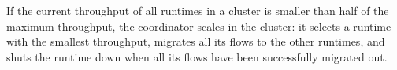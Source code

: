 If the current throughput of all runtimes in a cluster is smaller than half of the maximum throughput, the coordinator scales-in the cluster: it selects a runtime with the smallest throughput, migrates all its flows to the other runtimes, and shuts the runtime down when all its flows have been successfully migrated out.











